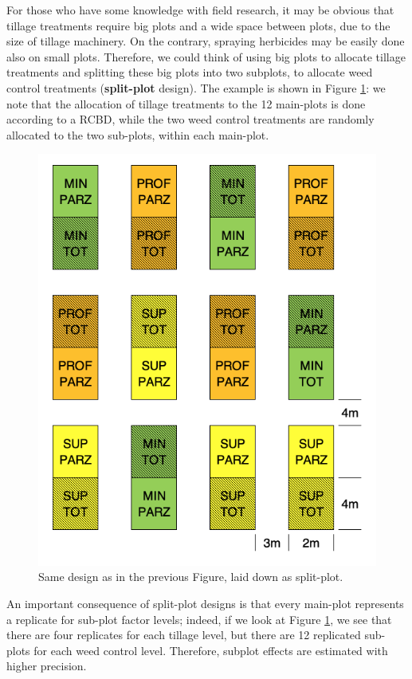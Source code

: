 \documentclass[a4paper,12pt,oneside]{book}
\begin{document}
For those who have some knowledge with field research, it may be obvious that tillage treatments require big plots and a wide space between plots, due to the size of tillage machinery. On the contrary, spraying herbicides may be easily done also on small plots. Therefore, we could think of using big plots to allocate tillage treatments and splitting these big plots into two subplots, to allocate weed control treatments (\textbf{split-plot} design). The example is shown in Figure \ref{fig:figName38}: we note that the allocation of tillage treatments to the 12 main-plots is done according to a RCBD, while the two weed control treatments are randomly allocated to the two sub-plots, within each main-plot.

\begin{figure}

{\centering \includegraphics[width=0.75\linewidth]{_images/Mappa3split} 

}

\caption{Same design as in the previous Figure, laid down as split-plot.}\label{fig:figName38}
\end{figure}

An important consequence of split-plot designs is that every main-plot represents a replicate for sub-plot factor levels; indeed, if we look at Figure \ref{fig:figName38}, we see that there are four replicates for each tillage level, but there are 12 replicated sub-plots for each weed control level. Therefore, subplot effects are estimated with higher precision.
\end{document}
